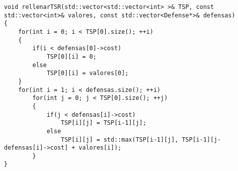 \begin{lstlisting}
void rellenarTSR(std::vector<std::vector<int> >& TSP, const std::vector<int>& valores, const std::vector<Defense*>& defensas)
{
    for(int i = 0; i < TSP[0].size(); ++i)
    {
        if(i < defensas[0]->cost)
            TSP[0][i] = 0;
        else 
            TSP[0][i] = valores[0];
    }
    for(int i = 1; i < defensas.size(); ++i)
        for(int j = 0; j < TSP[0].size(); ++j)
        {
            if(j < defensas[i]->cost)
                TSP[i][j] = TSP[i-1][j];
            else
                TSP[i][j] = std::max(TSP[i-1][j], TSP[i-1][j-defensas[i]->cost] + valores[i]);
        }
}
\end{lstlisting}